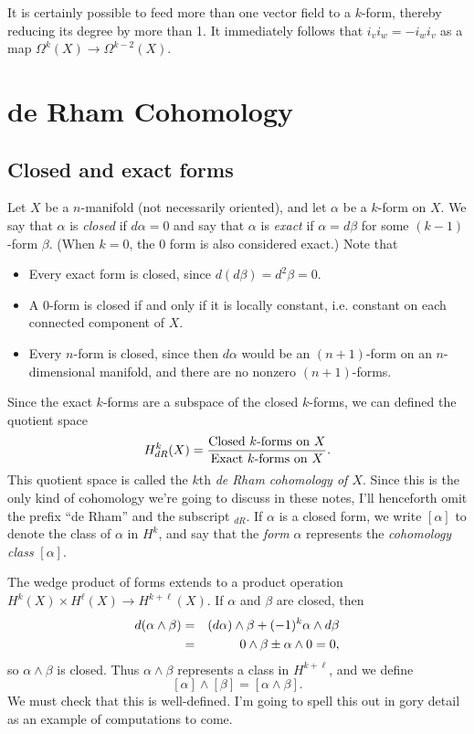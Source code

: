 \documentclass[12pt]{amsbook}
\theoremstyle{definition}
\begin{document}
It is certainly possible to feed more than one vector field to a 
$k$-form, thereby reducing its degree by more than 1. It immediately
follows that $i_vi_w = - i_wi_v$ as a map 
$\Omega^k(X) \to \Omega^{k-2}(X)$. 

\chapter{de Rham Cohomology}

\section{Closed and exact forms}

Let $X$ be a $n$-manifold (not necessarily oriented), and let $\alpha$ be a
$k$-form on $X$. We say that $\alpha$ is {\em closed} if $d\alpha=0$ and 
say that $\alpha$ is {\em exact} if $\alpha = d\beta$ for some 
$(k-1)$-form $\beta$. (When $k=0$, the 0 form is also considered exact.) Note that
\begin{itemize}
\item Every exact form is closed, since $d(d\beta)=d^2\beta=0$. 
\item A 0-form is closed if and only if it is locally constant, i.e.
constant on each connected component of $X$. 
\item Every $n$-form is closed, since then $d\alpha$ would be an $(n+1)$-form
on an $n$-dimensional manifold, and there are no nonzero $(n+1)$-forms. 
\end{itemize}

Since the exact $k$-forms are a subspace of the closed $k$-forms, we can
defined the quotient space 
$$ H^k_{dR}(X) = \frac{\hbox{Closed $k$-forms on $X$}}{\hbox{Exact $k$-forms
on $X$}}.$$
This quotient space is called the $k$th {\em de Rham cohomology of $X$}. 
Since this is the only kind of cohomology we're going to discuss in these
notes, I'll henceforth omit the prefix ``de Rham'' and the subscript ${}_{dR}$.  If $\alpha$ is a closed
form, we write $[\alpha]$ to denote the class of $\alpha$ in $H^k$, and say
that the {\em form} $\alpha$ represents the {\em cohomology class} $[\alpha]$. 

The wedge product of forms extends to a product operation 
$H^k(X) \times H^\ell(X) \to H^{k+\ell}(X)$. If $\alpha$ and $\beta$ are closed,
then
\begin{eqnarray*}
d(\alpha \wedge \beta) & = & (d\alpha)\wedge \beta + (-1)^k \alpha \wedge d\beta
\cr &=& 0 \wedge \beta \pm \alpha \wedge 0 = 0,
\end{eqnarray*}
so $\alpha \wedge \beta$ is closed. Thus $\alpha \wedge \beta$ represents a 
class in $H^{k+\ell}$, and we define 
$$ [\alpha] \wedge [\beta] = [\alpha \wedge \beta].$$
We must check that this is well-defined. I'm going to spell this out in gory
detail as an example of computations to come.
\end{document}
